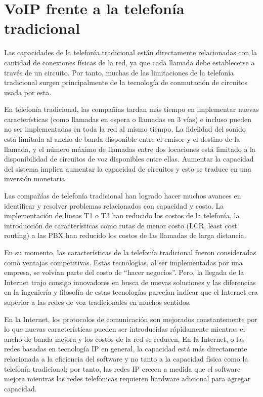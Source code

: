 	
\section{VoIP frente a la telefonía tradicional}
	
	Las capacidades de la telefonía tradicional están directamente relacionadas con la 
	cantidad de conexiones físicas de la red, ya que cada llamada debe establecerse a 
	través de un circuito. Por tanto, muchas de las limitaciones de la telefonía 
	tradicional surgen principalmente de la tecnología de conmutación de circuitos 
	usada por esta.
	
	En telefonía tradicional, las compañías tardan más tiempo en implementar nuevas 
	características (como llamadas en espera o llamadas en 3 vías) e incluso pueden 
	no ser implementadas en toda la red al mismo tiempo. La fidelidad del sonido 
	está limitada al ancho de banda disponible entre el emisor y el destino de la 
	llamada, y el número máximo de llamadas entre dos locaciones está limitado a 
	la disponibilidad de circuitos de voz disponibles entre ellas. Aumentar la 
	capacidad del sistema implica aumentar la capacidad de circuitos y esto se
	 traduce en una inversión monetaria. 
	 
	Las compañías de telefonía tradicional han logrado hacer muchos avances en 
	identificar y resolver problemas relacionados con capacidad y costo. La 
	implementación de líneas T1 o T3 han reducido los costos de la telefonía, 
	la introducción de características como rutas de menor costo (LCR, least 
	cost routing) a las PBX han reducido los costos de las llamadas de larga 
	distancia.
	 
	En su momento, las características de la telefonía tradicional fueron
	 consideradas como ventajas competitivas. Estas tecnologías, al ser 
	 implementadas por una empresa, se volvían parte del costo de “hacer 
	 negocios”. Pero, la llegada de la Internet trajo consigo innovadores 
	 en busca de nuevas soluciones y las diferencias en la ingeniería y 
	 filosofía de estas tecnologías parecían indicar que el Internet era 
	 superior a las redes de voz tradicionales en muchos sentidos.
	 
	En la Internet, los protocolos de comunicación son mejorados constantemente 
	por lo que nuevas características pueden ser introducidas rápidamente mientras 
	el ancho de banda mejora y los costos de la red se reducen. En la Internet, o
	 las redes basadas en tecnología IP en general, la capacidad está más 
	 directamente relacionada a la eficiencia del software y no tanto a la 
	 capacidad física como la telefonía tradicional; por tanto, las redes IP 
	 crecen a medida que el software mejora mientras las redes telefónicas 
	 requieren hardware adicional para agregar capacidad. 
	 
